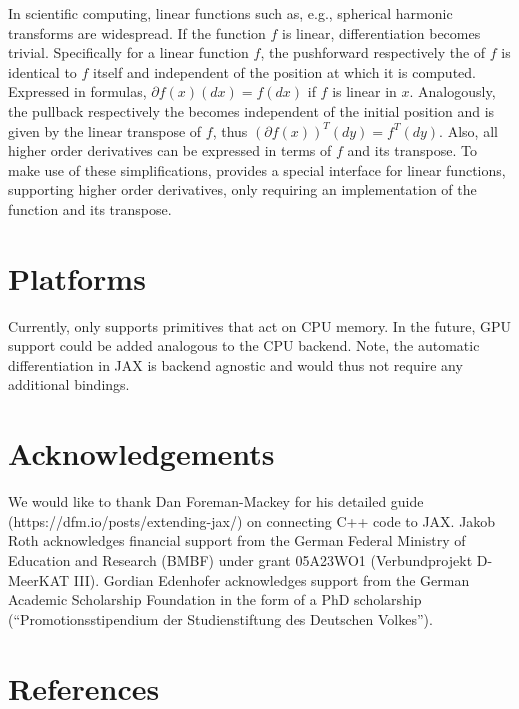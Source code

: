 \documentclass[10pt,a4paper,onecolumn]{article}
\let\textttOrig=\texttt
\def\texttt#1{\expandafter\textttOrig{\seqsplit{#1}}}
\begin{document}
In scientific computing, linear functions such as, e.g., spherical
harmonic transforms are widespread. If the function \(f\) is linear,
differentiation becomes trivial. Specifically for a linear function
\(f\), the pushforward respectively the \texttt{jvp} of \(f\) is
identical to \(f\) itself and independent of the position at which it is
computed. Expressed in formulas, \(\partial f(x)(dx) = f(dx)\) if \(f\)
is linear in \(x\). Analogously, the pullback respectively the
\texttt{vjp} becomes independent of the initial position and is given by
the linear transpose of \(f\), thus
\((\partial f(x))^{T}(dy) = f^T(dy)\). Also, all higher order
derivatives can be expressed in terms of \(f\) and its transpose. To
make use of these simplifications, \texttt{JAXbind} provides a special
interface for linear functions, supporting higher order derivatives,
only requiring an implementation of the function and its transpose.

\hypertarget{platforms}{%
\section{Platforms}\label{platforms}}

Currently, \texttt{JAXbind} only supports primitives that act on CPU memory.
In the future, GPU support could be added analogous to the CPU backend.
Note, the automatic differentiation in JAX is backend agnostic and would thus not require any additional bindings.

\hypertarget{acknowledgements}{%
\section{Acknowledgements}\label{acknowledgements}}

We would like to thank Dan Foreman-Mackey for his detailed guide
(https://dfm.io/posts/extending-jax/) on connecting C++ code to JAX.
Jakob Roth acknowledges financial support from the German Federal
Ministry of Education and Research (BMBF) under grant 05A23WO1
(Verbundprojekt D-MeerKAT III). Gordian Edenhofer acknowledges support
from the German Academic Scholarship Foundation in the form of a PhD
scholarship (``Promotionsstipendium der Studienstiftung des Deutschen
Volkes'').

\hypertarget{references}{%
\section{References}\label{references}}
\end{document}
